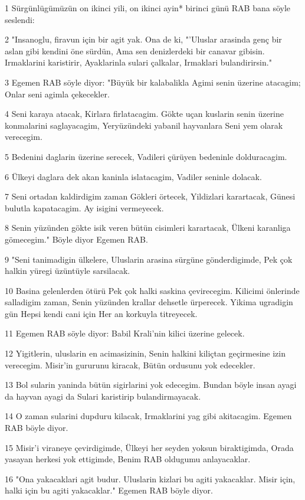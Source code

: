 \par 1 Sürgünlügümüzün on ikinci yili, on ikinci ayin* birinci günü RAB bana söyle seslendi:
\par 2 "Insanoglu, firavun için bir agit yak. Ona de ki, "'Uluslar arasinda genç bir aslan gibi kendini öne sürdün, Ama sen denizlerdeki bir canavar gibisin. Irmaklarini karistirir, Ayaklarinla sulari çalkalar, Irmaklari bulandirirsin."
\par 3 Egemen RAB söyle diyor: "Büyük bir kalabalikla Agimi senin üzerine atacagim; Onlar seni agimla çekecekler.
\par 4 Seni karaya atacak, Kirlara firlatacagim. Gökte uçan kuslarin senin üzerine konmalarini saglayacagim, Yeryüzündeki yabanil hayvanlara Seni yem olarak verecegim.
\par 5 Bedenini daglarin üzerine serecek, Vadileri çürüyen bedeninle dolduracagim.
\par 6 Ülkeyi daglara dek akan kaninla islatacagim, Vadiler seninle dolacak.
\par 7 Seni ortadan kaldirdigim zaman Gökleri örtecek, Yildizlari karartacak, Günesi bulutla kapatacagim. Ay isigini vermeyecek.
\par 8 Senin yüzünden gökte isik veren bütün cisimleri karartacak, Ülkeni karanliga gömecegim." Böyle diyor Egemen RAB.
\par 9 "Seni tanimadigin ülkelere, Uluslarin arasina sürgüne gönderdigimde, Pek çok halkin yüregi üzüntüyle sarsilacak.
\par 10 Basina gelenlerden ötürü Pek çok halki saskina çevirecegim. Kilicimi önlerinde salladigim zaman, Senin yüzünden krallar dehsetle ürperecek. Yikima ugradigin gün Hepsi kendi cani için Her an korkuyla titreyecek.
\par 11 Egemen RAB söyle diyor: Babil Krali'nin kilici üzerine gelecek.
\par 12 Yigitlerin, uluslarin en acimasizinin, Senin halkini kiliçtan geçirmesine izin verecegim. Misir'in gururunu kiracak, Bütün ordusunu yok edecekler.
\par 13 Bol sularin yaninda bütün sigirlarini yok edecegim. Bundan böyle insan ayagi da hayvan ayagi da Sulari karistirip bulandirmayacak.
\par 14 O zaman sularini dupduru kilacak, Irmaklarini yag gibi akitacagim. Egemen RAB böyle diyor.
\par 15 Misir'i viraneye çevirdigimde, Ülkeyi her seyden yoksun biraktigimda, Orada yasayan herkesi yok ettigimde, Benim RAB oldugumu anlayacaklar.
\par 16 "Ona yakacaklari agit budur. Uluslarin kizlari bu agiti yakacaklar. Misir için, halki için bu agiti yakacaklar." Egemen RAB böyle diyor.
